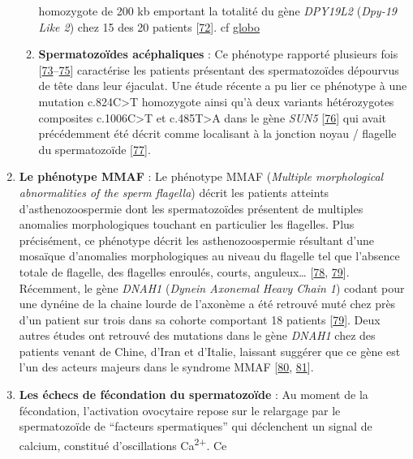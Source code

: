 \documentclass[12pt,twoside]{ugathesis}
\theoremstyle{definition}
\theoremstyle{definition}
\theoremstyle{remark}
\begin{document}
\begin{enumerate}
\begin{enumerate}
    homozygote de 200 kb emportant la totalité du gène \emph{DPY19L2}
    (\emph{Dpy-19 Like 2}) chez 15 des 20 patients
    {[}\protect\hyperlink{ref-Harbuz2011}{72}{]}. cf
    \protect\hyperlink{globo}{globo}\\
  \item
    \textbf{Spermatozoïdes acéphaliques} : Ce phénotype rapporté
    plusieurs fois
    {[}\protect\hyperlink{ref-Chemes2010}{73}--\protect\hyperlink{ref-Chemes1987}{75}{]}
    caractérise les patients présentant des spermatozoïdes dépourvus de
    tête dans leur éjaculat. Une étude récente a pu lier ce phénotype à
    une mutation c.824C\textgreater{}T homozygote ainsi qu'à deux
    variants hétérozygotes composites c.1006C\textgreater{}T et
    c.485T\textgreater{}A dans le gène \emph{SUN5}
    {[}\protect\hyperlink{ref-Zhu2016}{76}{]} qui avait précédemment été
    décrit comme localisant à la jonction noyau / flagelle du
    spermatozoïde {[}\protect\hyperlink{ref-Yassine2015}{77}{]}.
  \end{enumerate}
\item
  \textbf{Le phénotype MMAF} : Le phénotype MMAF (\emph{Multiple
  morphological abnormalities of the sperm flagella}) décrit les
  patients atteints d'asthenozoospermie dont les spermatozoïdes
  présentent de multiples anomalies morphologiques touchant en
  particulier les flagelles. Plus précisément, ce phénotype décrit les
  asthenozoospermie résultant d'une mosaïque d'anomalies morphologiques
  au niveau du flagelle tel que l'absence totale de flagelle, des
  flagelles enroulés, courts, anguleux\ldots{}
  {[}\protect\hyperlink{ref-Coutton2015}{78},
  \protect\hyperlink{ref-BenKhelifa2014}{79}{]}. Récemment, le gène
  \emph{DNAH1} (\emph{Dynein Axonemal Heavy Chain 1}) codant pour une
  dynéine de la chaine lourde de l'axonème a été retrouvé muté chez près
  d'un patient sur trois dans sa cohorte comportant 18 patients
  {[}\protect\hyperlink{ref-BenKhelifa2014}{79}{]}. Deux autres études
  ont retrouvé des mutations dans le gène \emph{DNAH1} chez des patients
  venant de Chine, d'Iran et d'Italie, laissant suggérer que ce gène est
  l'un des acteurs majeurs dans le syndrome MMAF
  {[}\protect\hyperlink{ref-Wang2017}{80},
  \protect\hyperlink{ref-Amiri-Yekta2016}{81}{]}.
\item
  \textbf{Les échecs de fécondation du spermatozoïde} : Au moment de la
  fécondation, l'activation ovocytaire repose sur le relargage par le
  spermatozoïde de ``facteurs spermatiques'' qui déclenchent un signal
  de calcium, constitué d'oscillations Ca\textsuperscript{2+}. Ce

\end{enumerate}
\end{document}
